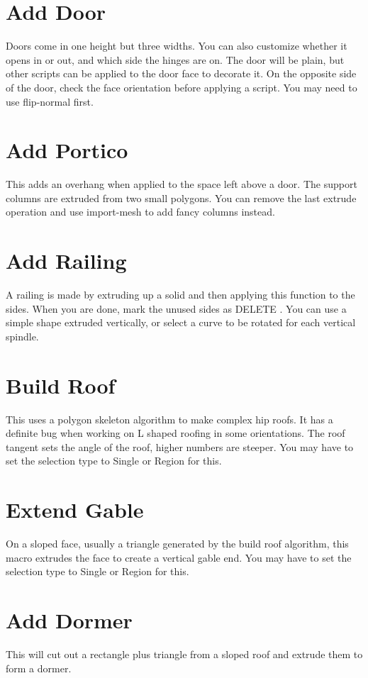 \documentclass[11pt]{article}
\begin{document}
    \section{Add Door}
    Doors come in one height but three widths.
    You can also customize whether it opens in or out, and which side the hinges are on.
    The door will be plain, but other scripts can be applied to the door face to decorate it.
    On the opposite side of the door, check the face orientation before applying a script.
    You may need to use flip-normal first.

    \section{Add Portico}
    This adds an overhang when applied to the space left above a door.
    The support columns are extruded from two small polygons.
    You can remove the last extrude operation and use import-mesh to add fancy columns instead.

    \section{Add Railing}
    A railing is made by extruding up a solid and then applying this function to the sides.
    When you are done, mark the unused sides as DELETE .
    You can use a simple shape extruded vertically, or select a curve to be rotated for each vertical spindle.

    \section{Build Roof}
    This uses a polygon skeleton algorithm to make complex hip roofs.
    It has a definite bug when working on L shaped roofing in some orientations.
    The roof tangent sets the angle of the roof, higher numbers are steeper.
    You may have to set the selection type to Single or Region for this.

    \section{Extend Gable}
    On a sloped face, usually a triangle generated by the build roof algorithm, this macro extrudes the face to create
    a vertical gable end.
    You may have to set the selection type to Single or Region for this.

    \section{Add Dormer}
    This will cut out a rectangle plus triangle from a sloped roof and extrude them to form a dormer.
\end{document}
